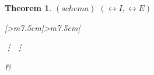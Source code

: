 \documentclass[10pt,a4paper]{book}
\newtheorem{theorem}{Theorem}[section]
\begin{document}
\begin{theorem}
    \textbf{$(schema)$} $(\leftrightarrow I , \leftrightarrow E)$

    \begin{tabular}{|>{\centering\arraybackslash}m{7.5cm}|>{\centering\arraybackslash}m{7.5cm}|}
        \hline
        \begin{fitchproof}[arrayenv=tabular]
            \open
             {\varphi}
             {\vdots}
             {\psi}
            \close
            \open
             {\psi}
             {\vdots}
             {\varphi}
            \close
             {\therefore \varphi \leftrightarrow \psi} 
        \end{fitchproof}
        \rule[0pt]{0pt}{0pt} &

        \begin{minipage}[t]{\linewidth}
            \centering
            \begin{minipage}[t]{0.48\linewidth}
                \begin{fitchproof}[arrayenv=tabular]
                     {\varphi \leftrightarrow \psi}
                     {\varphi }
                     {\therefore \psi } 
                \end{fitchproof}
            \end{minipage}
            \begin{minipage}[t]{0.48\linewidth}
                \begin{fitchproof}[arrayenv=tabular]
                     {\varphi \leftrightarrow \psi}
                     {\psi}
                     {\therefore \varphi} 
                \end{fitchproof}
            \end{minipage}
        \end{minipage}

        \\
        \hline
    \end{tabular}


\end{theorem}
\end{document}
